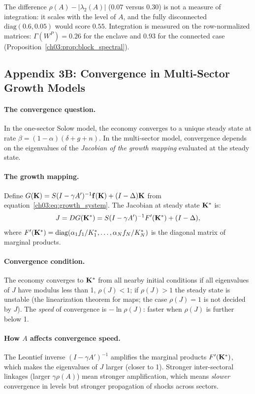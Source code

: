 \documentclass[../structural_economics_book.tex]{subfiles}
\begin{document}
The difference $\rho(A) - |\lambda_2(A)|$ ($0.07$ versus $0.30$) is not a measure of integration: it scales with the level of $A$, and the fully disconnected $\text{diag}(0.6, 0.05)$ would score $0.55$. Integration is measured on the row-normalized matrices: $\Gamma(W^P) = 0.26$ for the enclave and $0.93$ for the connected case (Proposition~\ref{ch03:prop:block_spectral}).


\subsection*{Appendix 3B: Convergence in Multi-Sector Growth Models}
\label{ch03:app:convergence}

\paragraph{The convergence question.} In the one-sector Solow model, the economy converges to a unique steady state at rate $\beta = (1-\alpha)(\delta + g + n)$. In the multi-sector model, convergence depends on the eigenvalues of the \textit{Jacobian of the growth mapping} evaluated at the steady state.

\paragraph{The growth mapping.} Define $G(\mathbf{K}) = S(I - \gamma A')^{-1}\mathbf{f}(\mathbf{K}) + (I - \Delta)\mathbf{K}$ from equation~\eqref{ch03:eq:growth_system}. The Jacobian at steady state $\mathbf{K}^*$ is:
\begin{equation}
J = DG(\mathbf{K}^*) = S(I - \gamma A')^{-1}F'(\mathbf{K}^*) + (I - \Delta),
\end{equation}
where $F'(\mathbf{K}^*) = \text{diag}(\alpha_1 f_1/K_1^*, \ldots, \alpha_N f_N/K_N^*)$ is the diagonal matrix of marginal products.

\paragraph{Convergence condition.} The economy converges to $\mathbf{K}^*$ from all nearby initial conditions if all eigenvalues of $J$ have modulus less than 1, $\rho(J) < 1$; if $\rho(J) > 1$ the steady state is unstable (the linearization theorem for maps; the case $\rho(J) = 1$ is not decided by $J$). The \textit{speed} of convergence is $-\ln\rho(J)$: faster when $\rho(J)$ is further below 1.

\paragraph{How $A$ affects convergence speed.} The Leontief inverse $(I - \gamma A')^{-1}$ amplifies the marginal products $F'(\mathbf{K}^*)$, which makes the eigenvalues of $J$ larger (closer to 1). Stronger inter-sectoral linkages (larger $\gamma\rho(A)$) mean stronger amplification, which means \textit{slower} convergence in levels but stronger propagation of shocks across sectors.
\end{document}
